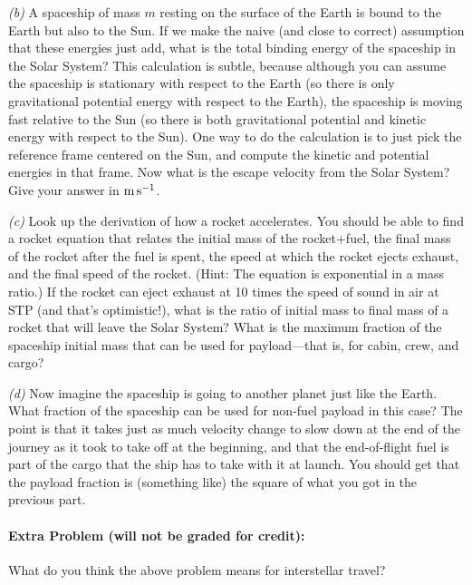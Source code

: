 \documentclass[12pt]{article}
\begin{document}
\textsl{(b)} A spaceship of mass $m$ resting on the surface of the
Earth is bound to the Earth but also to the Sun. If we make
the naive (and close to correct) assumption that these energies just
add, what is the total binding energy of the spaceship in the Solar
System? This calculation is subtle, because although you can assume
the spaceship is stationary with respect to the Earth (so there is
only gravitational potential energy with respect to the Earth), the
spaceship is moving fast relative to the Sun (so there is both
gravitational potential and kinetic energy with respect to the
Sun). One way to do the calculation is to just pick the reference
frame centered on the Sun, and compute the kinetic and potential
energies in that frame. Now what is the escape velocity from the Solar
System? Give your answer in $\mathrm{m}\,\mathrm{s}^{-1}$.

\textsl{(c)} Look up the derivation of how a rocket accelerates. You
should be able to find a rocket equation that relates the initial mass
of the rocket+fuel, the final mass of the rocket after the fuel is
spent, the speed at which the rocket ejects exhaust, and the final
speed of the rocket. (Hint: The equation is exponential in a mass
ratio.) If the rocket can eject exhaust at 10 times the speed of sound
in air at STP (and that's optimistic!), what is the ratio of initial
mass to final mass of a rocket that will leave the Solar System? What
is the maximum fraction of the spaceship initial mass that can be used
for payload---that is, for cabin, crew, and cargo?

\textsl{(d)} Now imagine the spaceship is going to another planet just
like the Earth. What fraction of the spaceship can be used for
non-fuel payload in this case? The point is that it takes just as much
velocity change to slow down at the end of the journey as it took to
take off at the beginning, and that the end-of-flight fuel is part of
the cargo that the ship has to take with it at launch. You should get
that the payload fraction is (something like) the square of what you got in
the previous part.

\paragraph{Extra Problem (will not be graded for credit):}%
What do you think the above problem means for interstellar travel?
\end{document}
